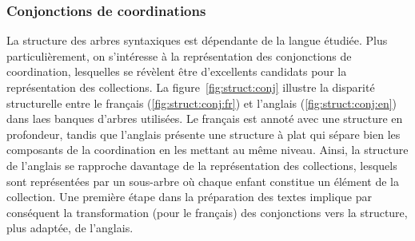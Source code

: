 \subsubsection{Conjonctions de coordinations}
La structure des arbres syntaxiques est dépendante de la langue étudiée.
Plus particulièrement, on s'intéresse à la représentation des conjonctions de coordination, lesquelles se révèlent être d'excellents candidats pour la représentation des collections.
La figure~\ref{fig:struct:conj} illustre la disparité structurelle entre le français (\ref{fig:struct:conj:fr}) et l'anglais (\ref{fig:struct:conj:en}) dans laes banques d'arbres utilisées.
Le français est annoté avec une structure en profondeur, tandis que l'anglais présente une structure à plat qui sépare bien les composants de la coordination en les mettant au même niveau.
Ainsi, la structure de l'anglais se rapproche davantage de la représentation des collections, lesquels sont représentées par un sous-arbre où chaque enfant constitue un élément de la collection.
Une première étape dans la préparation des textes implique par conséquent la transformation (pour le français) des conjonctions vers la structure, plus adaptée, de l'anglais.

